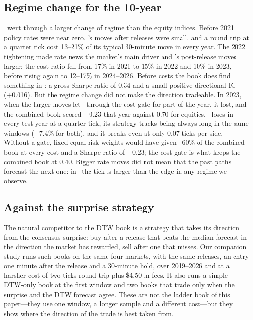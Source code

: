 \subsection{Regime change for the 10-year}\label{sec:treasury_result}

\ZN\ went through a larger change of regime than the equity indices. Before 2021 policy rates
were near zero, \ZN's moves after releases were small, and a round trip at a quarter tick cost
13--21\% of its typical 30-minute move in every year. The 2022 tightening made rate news the
market's main driver and \ZN's post-release moves larger: the cost ratio fell from 17\% in 2021
to 15\% in 2022 and 10\% in 2023, before rising again to 12--17\% in 2024--2026. Before costs the
book does find something in \ZN: a gross Sharpe ratio of 0.34 and a small positive directional IC
(+0.016). But the regime change did not make the direction tradeable. In 2023, when the larger
moves let \ZN\ through the cost gate for part of the year, it lost, and the combined book scored
$-0.23$ that year against 0.70 for equities. \ZN\ loses in every test year at a quarter tick, its
strategy tracks being always long in the same windows ($-7.4\%$ for both), and it breaks even at
only 0.07 ticks per side. Without a gate, fixed equal-risk weights would have given \ZN\ 60\% of
the combined book at every cost and a Sharpe ratio of $-0.23$; the cost gate is what keeps the
combined book at 0.40. Bigger rate moves did not mean that the past paths forecast the next one:
in \ZN\ the tick is larger than the edge in any regime we observe.

\subsection{Against the surprise strategy}\label{sec:vs_surprise}

The natural competitor to the DTW book is a strategy that takes its direction from the consensus
surprise: buy after a release that beats the median forecast in the direction the market has
rewarded, sell after one that misses. Our companion study runs such books on the same four markets,
with the same releases, an entry one minute after the release and a 30-minute hold, over 2019--2026
and at a harsher cost of two ticks round trip plus \$4.50 in fees. It also runs a simple DTW-only
book at the first window and two books that trade only when the surprise and the DTW forecast agree.
These are not the ladder book of this paper---they use one window, a longer sample and a different
cost---but they show where the direction of the trade is best taken from.


